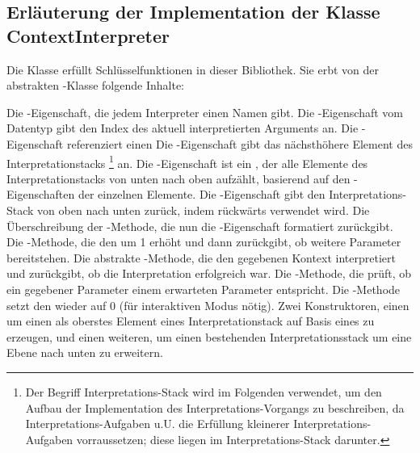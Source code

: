 \subsection{Erläuterung der Implementation der Klasse ContextInterpreter}\label{subsec:ContextInterpreter}
Die Klasse  erfüllt Schlüsselfunktionen in dieser Bibliothek.
Sie erbt von der abstrakten -Klasse folgende Inhalte:
\begin{outline}
 \1 Die -Eigenschaft, die jedem Interpreter einen Namen gibt.
 \1 Die -Eigenschaft vom Datentyp  gibt den Index des aktuell interpretierten Arguments an.
 \1 Die -Eigenschaft referenziert einen 
 \1 Die -Eigenschaft gibt das nächsthöhere Element des Interpretationstacks
 \footnote{Der Begriff Interpretations-Stack wird im Folgenden verwendet, um den Aufbau der Implementation des Interpretations-Vorgangs zu beschreiben, da Interpretations-Aufgaben u.U. die Erfüllung kleinerer Interpretations-Aufgaben vorraussetzen; diese liegen im Interpretations-Stack darunter.}
 an.%
 \1 Die -Eigenschaft ist ein , der alle Elemente des Interpretationstacks von unten nach oben aufzählt,
 basierend auf den -Eigenschaften der einzelnen Elemente.
 \1 Die -Eigenschaft gibt den Interpretations-Stack von oben nach unten zurück, indem  rückwärts verwendet wird.
 \1 Die Überschreibung der -Methode, die nun die -Eigenschaft formatiert zurückgibt.
 \1 Die -Methode, die den  um 1 erhöht und dann zurückgibt, ob weitere Parameter bereitstehen.
 \1 Die abstrakte -Methode, die den gegebenen Kontext interpretiert und zurückgibt, ob die Interpretation erfolgreich war.
 \1 Die -Methode, die prüft, ob ein gegebener Parameter einem erwarteten Parameter entspricht.
 \1 Die -Methode setzt den  wieder auf 0 (für interaktiven Modus nötig).
 \1 Zwei Konstruktoren, einen um einen  als oberstes Element eines Interpretationstack auf Basis eines  zu erzeugen, und einen weiteren, um einen bestehenden Interpretationsstack um eine Ebene nach unten zu erweitern.
\end{outline}
